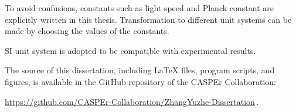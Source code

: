 
To avoid confusions, constants such as light speed and Planck constant are explicitly written in this thesis. Transformation to different unit systems can be made by choosing the values of the constants. 

SI unit system is adopted to be compatible with experimental results. 

The source of this dissertation, including \LaTeX{} files, program scripts, and figures, is available in the GitHub repository of the CASPEr Collaboration:
\begin{center}
    \url{https://github.com/CASPEr-Collaboration/ZhangYuzhe-Dissertation}\,.
\end{center}
